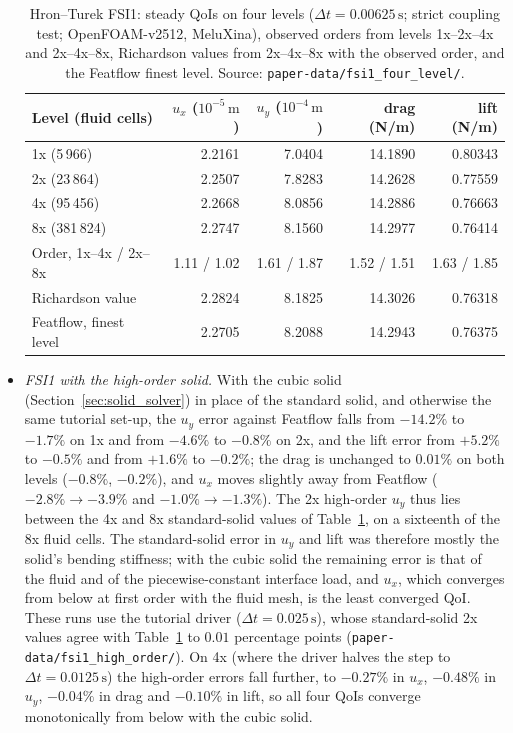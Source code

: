 \begin{itemize}
\begin{table}[htbp]
	\centering
	\footnotesize
	\caption{Hron--Turek FSI1: steady QoIs on four levels ($\Delta t = 0.00625\,\mathrm{s}$; strict coupling test; OpenFOAM-v2512, MeluXina), observed orders from levels 1x--2x--4x and 2x--4x--8x, Richardson values from 2x--4x--8x with the observed order, and the Featflow finest level. Source: \texttt{paper-data/fsi1\_four\_level/}.}
	\label{tab:fsi1}
	\begin{tabular}{lrrrr}
		\toprule
		Level (fluid cells) & $u_x$ ($10^{-5}\,\mathrm{m}$) & $u_y$ ($10^{-4}\,\mathrm{m}$) & drag (N/m) & lift (N/m) \\
		\midrule
		1x (5\,966) & 2.2161 & 7.0404 & 14.1890 & 0.80343 \\
		2x (23\,864) & 2.2507 & 7.8283 & 14.2628 & 0.77559 \\
		4x (95\,456) & 2.2668 & 8.0856 & 14.2886 & 0.76663 \\
		8x (381\,824) & 2.2747 & 8.1560 & 14.2977 & 0.76414 \\
		\midrule
		Order, 1x--4x / 2x--8x & 1.11 / 1.02 & 1.61 / 1.87 & 1.52 / 1.51 & 1.63 / 1.85 \\
		Richardson value & 2.2824 & 8.1825 & 14.3026 & 0.76318 \\
		Featflow, finest level & 2.2705 & 8.2088 & 14.2943 & 0.76375 \\
		\bottomrule
	\end{tabular}
\end{table}
	\item \emph{FSI1 with the high-order solid.} With the cubic solid (Section~\ref{sec:solid_solver}) in place of the standard solid, and otherwise the same tutorial set-up, the $u_y$ error against Featflow falls from $-14.2\%$ to $-1.7\%$ on 1x and from $-4.6\%$ to $-0.8\%$ on 2x, and the lift error from $+5.2\%$ to $-0.5\%$ and from $+1.6\%$ to $-0.2\%$; the drag is unchanged to $0.01\%$ on both levels ($-0.8\%$, $-0.2\%$), and $u_x$ moves slightly away from Featflow ($-2.8\%\to-3.9\%$ and $-1.0\%\to-1.3\%$). The 2x high-order $u_y$ thus lies between the 4x and 8x standard-solid values of Table~\ref{tab:fsi1}, on a sixteenth of the 8x fluid cells. The standard-solid error in $u_y$ and lift was therefore mostly the solid's bending stiffness; with the cubic solid the remaining error is that of the fluid and of the piecewise-constant interface load, and $u_x$, which converges from below at first order with the fluid mesh, is the least converged QoI. These runs use the tutorial driver ($\Delta t = 0.025\,\mathrm{s}$), whose standard-solid 2x values agree with Table~\ref{tab:fsi1} to $0.01$ percentage points (\texttt{paper-data/fsi1\_high\_order/}). On 4x (where the driver halves the step to $\Delta t = 0.0125\,\mathrm{s}$) the high-order errors fall further, to $-0.27\%$ in $u_x$, $-0.48\%$ in $u_y$, $-0.04\%$ in drag and $-0.10\%$ in lift, so all four QoIs converge monotonically from below with the cubic solid.

\end{itemize}
